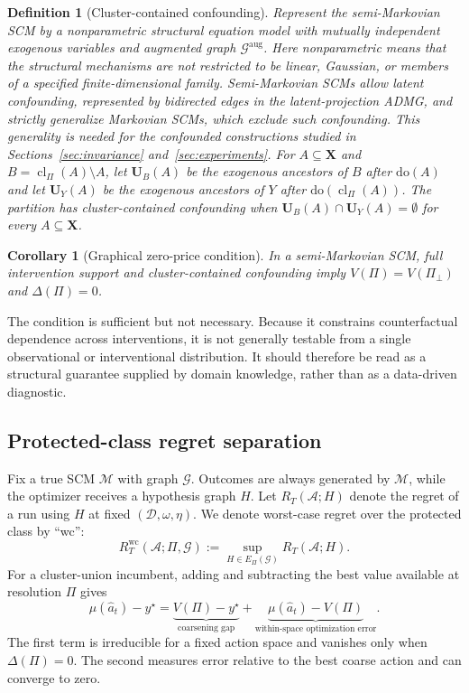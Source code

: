 \documentclass[twoside]{article}
\newtheorem{definition}{Definition}
\newtheorem{corollary}{Corollary}
\newcommand{\doo}{\mathrm{do}}
\newcommand{\Gg}{\mathcal{G}}
\begin{document}
\begin{definition}[Cluster-contained confounding]
\label{def:ccc}
Represent the semi-Markovian SCM by a nonparametric structural equation
model with mutually independent exogenous variables and augmented graph
$\Gg^{\mathrm{aug}}$. Here nonparametric means that the structural
mechanisms are not restricted to be linear, Gaussian, or members of a
specified finite-dimensional family. Semi-Markovian SCMs allow latent
confounding, represented by bidirected edges in the latent-projection ADMG,
and strictly generalize Markovian SCMs, which exclude such confounding. This
generality is needed for the confounded constructions studied in
Sections~\ref{sec:invariance} and~\ref{sec:experiments}. For
$A\subseteq\mathbf X$ and
$B=\operatorname{cl}_\Pi(A)\setminus A$, let $\mathbf U_B(A)$ be the
exogenous ancestors of $B$ after $\doo(A)$ and let $\mathbf U_Y(A)$ be the
exogenous ancestors of $Y$ after $\doo(\operatorname{cl}_\Pi(A))$. The
partition has cluster-contained confounding when
$\mathbf U_B(A)\cap\mathbf U_Y(A)=\emptyset$ for every
$A\subseteq\mathbf X$.
\end{definition}

\begin{corollary}[Graphical zero-price condition]
\label{cor:zero-price}
In a semi-Markovian SCM, full intervention support and cluster-contained
confounding imply $V(\Pi)=V(\Pi_\bot)$ and $\Delta(\Pi)=0$.
\end{corollary}

The condition is sufficient but not necessary. Because it constrains
counterfactual dependence across interventions, it is not generally
testable from a single observational or interventional distribution. It
should therefore be read as a structural guarantee supplied by domain
knowledge, rather than as a data-driven diagnostic.

\subsection{Protected-class regret separation}
\label{sec:separation}

Fix a true SCM $\mathcal M$ with graph $\Gg$. Outcomes are always generated
by $\mathcal M$, while the optimizer receives a hypothesis graph $H$. Let
$R_T(\mathcal A;H)$ denote the regret of a run using $H$ at fixed
$(\mathcal D,\omega,\eta)$. We denote worst-case regret over the protected
class by ``wc'':
\[
 R_T^{\mathrm{wc}}(\mathcal A;\Pi,\Gg)
 :=\sup_{H\in E_\Pi(\Gg)}R_T(\mathcal A;H).
\]
For a cluster-union incumbent, adding and subtracting the best value
available at resolution $\Pi$ gives
\begin{equation}
 \mu(\hat a_t)-y^\star
 =\underbrace{V(\Pi)-y^\star}_{\text{coarsening gap}}
 +\underbrace{\mu(\hat a_t)-V(\Pi)}_{\text{within-space optimization error}}.
 \label{eq:regret-decomposition}
\end{equation}
The first term is irreducible for a fixed action space and vanishes only
when $\Delta(\Pi)=0$. The second measures error relative to the best coarse
action and can converge to zero.
\end{document}
